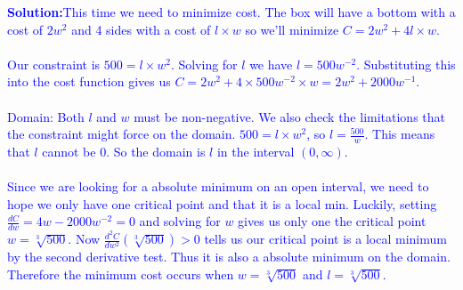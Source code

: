 \documentclass[letterpaper,11pt]{article}
\newcommand{\sol}[2]{\begin{minipage}[c][#1]{\linewidth}{\textcolor{blue}{\textbf{Solution:}}\quad \textcolor{blue}{#2}}\end{minipage}}
\newcommand{\sol}[2]{\begin{minipage}[c][#1]{\linewidth}{\vfill}\end{minipage}}
\begin{document}
\begin{enumerate}
\sol{3.5 in}{This time we need to minimize cost. The box will have a bottom with a cost of $2w^2$ and 4 sides with a cost of  $l \times w$ so we'll minimize $C=2w^2+4l \times w$.\\\\
Our constraint is $500=l \times w^2$. Solving for $l$ we have $l=500w^{-2}$. Substituting this into the cost function gives us $C=2w^2+4 \times 500w^{-2} \times w=2w^2+2000w^{-1}.$\\\\
Domain: Both $l$ and $w$ must be non-negative.  We also check the limitations that the constraint might force on the domain. $500 = l \times w^2$, so $l = \frac{500}{w}$.  This means that $l$ cannot be 0. So the domain is $l$ in the interval $(0, \infty)$.\\\\
Since we are looking for a absolute minimum on an open interval, we need to hope we only have one critical point and that it is a local min. Luckily, setting $\frac{dC}{dw}=4w-2000w^{-2}=0$ and solving for $w$ gives us only one the critical point $w=\sqrt[3]{500}$.  Now $\frac{d^2C}{dw^2}(\sqrt[3]{500})>0$ tells us our critical point is a local minimum by the second derivative test. Thus it is also a absolute minimum on the domain. Therefore the minimum cost occurs when $w=\sqrt[3]{500}$ and $l=\sqrt[3]{500}$.}



\begin{comment}




\end{comment}
\end{enumerate}
\end{document}
